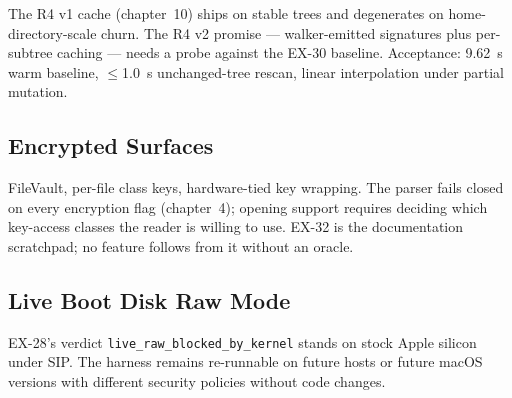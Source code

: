 The R4 v1 cache (chapter~10) ships on stable trees and degenerates
on home-directory-scale churn. The R4 v2 promise --- walker-emitted
signatures plus per-subtree caching --- needs a probe against
the EX-30 baseline. Acceptance: 9.62~s warm baseline,
$\leq$1.0~s unchanged-tree rescan, linear interpolation under
partial mutation.

\subsection{Encrypted Surfaces}

FileVault, per-file class keys, hardware-tied key wrapping. The
parser fails closed on every encryption flag (chapter~4); opening
support requires deciding which key-access classes the reader is
willing to use. EX-32 is the documentation scratchpad; no
feature follows from it without an oracle.

\subsection{Live Boot Disk Raw Mode}

EX-28's verdict
\texttt{live\_raw\_blocked\_by\_kernel} stands on stock Apple
silicon under SIP. The harness remains re-runnable on future
hosts or future macOS versions with different security policies
without code changes.

